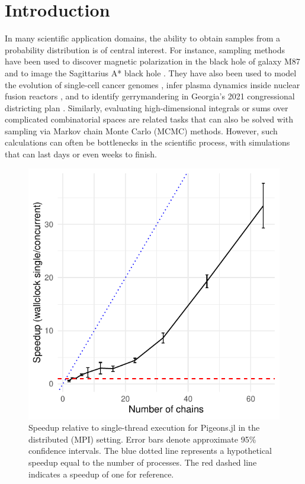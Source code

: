 \section{Introduction}
In many scientific application domains, the ability to obtain samples from a 
probability distribution is of central interest. 
For instance, sampling methods have been used to discover magnetic polarization 
in the black hole of galaxy M87 \cite{akiyama2021seven}
and to image the Sagittarius A* black hole \cite{akiyama2022first}.
They have also been used to 
model the evolution of single-cell cancer genomes \cite{salehi2021clonal}, 
infer plasma dynamics inside nuclear fusion reactors \cite{gota2021overview}, 
and to identify gerrymandering in Georgia's 2021 congressional districting plan 
\cite{zhao2022mathematically}.
Similarly, evaluating high-dimensional integrals or sums over complicated 
combinatorial spaces are related tasks that can also be solved with sampling 
via Markov chain Monte Carlo (MCMC) methods. 
However, such calculations can often be bottlenecks in the scientific process, with 
simulations that can last days or even weeks to finish. 

\begin{figure}[t]
    \centering
    \includegraphics[width=0.7\linewidth]{../img/speedup_distributed.pdf}
    \caption{
        Speedup relative to single-thread execution for Pigeons.jl in the distributed 
        (MPI) setting. Error bars denote approximate 95\% confidence intervals.
        The blue dotted line represents a hypothetical speedup equal to the 
        number of processes. The red dashed line indicates a speedup of one for reference.
    }
    \label{fig:PT_scaling}
\end{figure}

